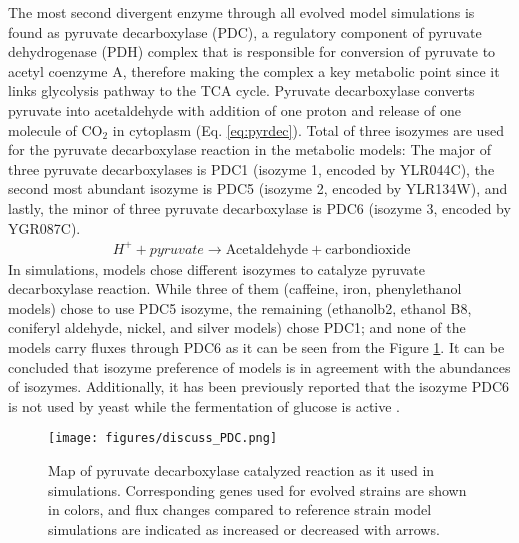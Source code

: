 The most second divergent enzyme through all evolved model simulations is found as pyruvate decarboxylase (PDC), a regulatory component of pyruvate dehydrogenase (PDH) complex that is responsible for conversion of pyruvate to acetyl coenzyme A, therefore making the complex a key metabolic point since it links glycolysis pathway to the TCA cycle. Pyruvate decarboxylase converts pyruvate into acetaldehyde with addition of one proton and release of one molecule of CO$_2$ in cytoplasm (Eq. \ref{eq:pyrdec}). Total of three isozymes are used for the pyruvate decarboxylase reaction in the metabolic models: The major of three pyruvate decarboxylases is PDC1 (isozyme 1, encoded by YLR044C), the second most abundant isozyme is PDC5 (isozyme 2, encoded by YLR134W), and lastly, the minor of three pyruvate decarboxylase is PDC6 (isozyme 3, encoded by YGR087C).
\begin{align}
\label{eq:pyrdec}
\ H^+ + pyruvate \rightarrow \text{Acetaldehyde} + \text{carbondioxide}
\end{align}
In simulations, models chose different isozymes to catalyze pyruvate decarboxylase reaction. While three of them (caffeine,  iron,  phenylethanol models) chose to use PDC5 isozyme, the remaining (ethanolb2, ethanol B8, coniferyl aldehyde, nickel, and silver models) chose PDC1; and none of the models carry fluxes through PDC6 as it can be seen from the Figure \ref{fig:discuss_PDC}. It can be concluded that isozyme preference of models is in agreement with the abundances of isozymes. Additionally, it has been previously reported that the isozyme PDC6 is not used by yeast while the fermentation of glucose is active \cite{hohmann1991pdc6}.

\begin{figure}[H]
\texttt{[image: figures/discuss\_PDC.png]}
\caption[Map of pyruvate decarboxylase catalyzed reaction as it used in simulations]{Map of pyruvate decarboxylase catalyzed reaction as it used in simulations. Corresponding genes used for evolved strains are shown in colors, and flux changes compared to reference strain model simulations are indicated as increased or decreased with arrows.}
\label{fig:discuss_PDC}
\end{figure}

